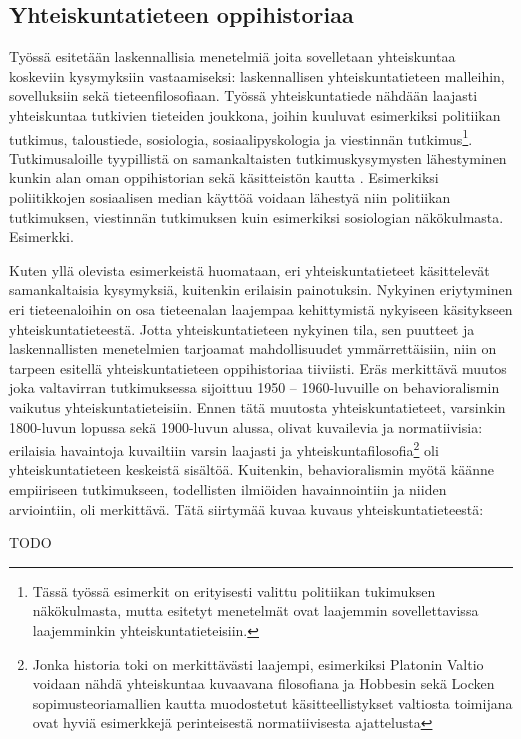 \documentclass[finnish,gradu,twoside,12pt]{tktltiki}
\begin{document}
\subsection{Yhteiskuntatieteen oppihistoriaa}

Työssä esitetään laskennallisia menetelmiä joita sovelletaan yhteiskuntaa koskeviin kysymyksiin vastaamiseksi: laskennallisen yhteiskuntatieteen malleihin, sovelluksiin sekä tieteenfilosofiaan. Työssä yhteiskuntatiede nähdään laajasti yhteiskuntaa tutkivien tieteiden joukkona, joihin kuuluvat esimerkiksi politiikan tutkimus, taloustiede, sosiologia, sosiaalipyskologia ja viestinnän tutkimus\footnote{Tässä työssä esimerkit on erityisesti valittu politiikan tukimuksen näkökulmasta, mutta esitetyt menetelmät ovat laajemmin sovellettavissa laajemminkin yhteiskuntatieteisiin.}. Tutkimusaloille tyypillistä on samankaltaisten tutkimuskysymysten lähestyminen kunkin alan oman oppihistorian sekä käsitteistön kautta \citep{a}. Esimerkiksi poliitikkojen sosiaalisen median käyttöä voidaan lähestyä niin politiikan tutkimuksen, viestinnän tutkimuksen kuin esimerkiksi sosiologian näkökulmasta. Esimerkki.

Kuten yllä olevista esimerkeistä huomataan, eri yhteiskuntatieteet käsittelevät samankaltaisia kysymyksiä, kuitenkin erilaisin painotuksin. Nykyinen eriytyminen eri tieteenaloihin on osa tieteenalan laajempaa kehittymistä nykyiseen käsitykseen yhteiskuntatieteestä. Jotta yhteiskuntatieteen nykyinen tila, sen puutteet ja laskennallisten menetelmien tarjoamat mahdollisuudet ymmärrettäisiin, niin on tarpeen esitellä yhteiskuntatieteen oppihistoriaa tiiviisti. Eräs merkittävä muutos joka valtavirran tutkimuksessa sijoittuu 1950 -- 1960-luvuille on behavioralismin vaikutus yhteiskuntatieteisiin. Ennen tätä muutosta yhteiskuntatieteet, varsinkin 1800-luvun lopussa sekä 1900-luvun alussa, olivat kuvailevia ja normatiivisia: erilaisia havaintoja kuvailtiin varsin laajasti \citep{x} ja yhteiskuntafilosofia\footnote{Jonka historia toki on merkittävästi laajempi, esimerkiksi Platonin Valtio voidaan nähdä yhteiskuntaa kuvaavana filosofiana ja Hobbesin sekä Locken sopimusteoriamallien kautta muodostetut käsitteellistykset valtiosta toimijana ovat hyviä esimerkkejä perinteisestä normatiivisesta ajattelusta} oli yhteiskuntatieteen keskeistä sisältöä. Kuitenkin, behavioralismin myötä käänne empiiriseen tutkimukseen, todellisten ilmiöiden havainnointiin ja niiden arviointiin, oli merkittävä. Tätä siirtymää kuvaa \citep[yy]{x} kuvaus yhteiskuntatieteestä:

TODO
\end{document}
